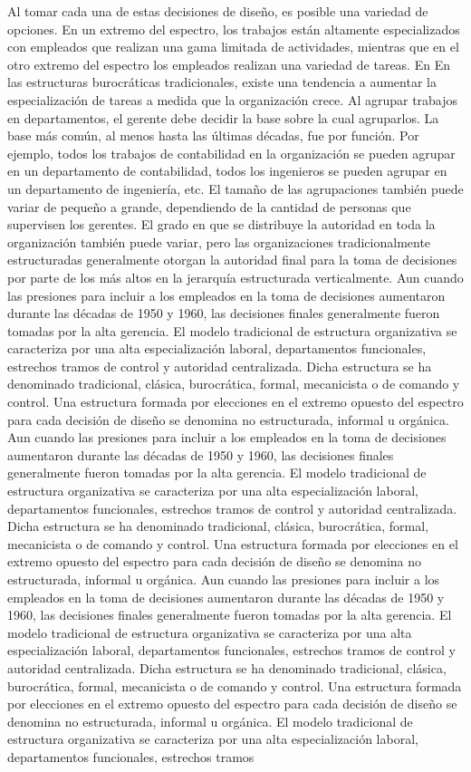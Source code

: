 \documentclass[10pt]{book}
\begin{document}
Al tomar cada una de estas decisiones de diseño, es posible una variedad de opciones. En un extremo del espectro, los trabajos están altamente especializados con empleados que realizan una gama limitada de actividades, mientras que en el otro extremo del espectro los empleados realizan una variedad de tareas. En En las estructuras burocráticas tradicionales, existe una tendencia a aumentar la especialización de tareas a medida que la organización crece. Al agrupar trabajos en departamentos, el gerente debe decidir la base sobre la cual agruparlos. La base más común, al menos hasta las últimas décadas, fue por función. Por ejemplo, todos los trabajos de contabilidad en la organización se pueden agrupar en un departamento de contabilidad, todos los ingenieros se pueden agrupar en un departamento de ingeniería, etc. El tamaño de las agrupaciones también puede variar de pequeño a grande, dependiendo de la cantidad de personas que supervisen los gerentes. El grado en que se distribuye la autoridad en toda la organización también puede variar, pero las organizaciones tradicionalmente estructuradas generalmente otorgan la autoridad final para la toma de decisiones por parte de los más altos en la jerarquía estructurada verticalmente. Aun cuando las presiones para incluir a los empleados en la toma de decisiones aumentaron durante las décadas de 1950 y 1960, las decisiones finales generalmente fueron tomadas por la alta gerencia. El modelo tradicional de estructura organizativa se caracteriza por una alta especialización laboral, departamentos funcionales, estrechos tramos de control y autoridad centralizada. Dicha estructura se ha denominado tradicional, clásica, burocrática, formal, mecanicista o de comando y control. Una estructura formada por elecciones en el extremo opuesto del espectro para cada decisión de diseño se denomina no estructurada, informal u orgánica. Aun cuando las presiones para incluir a los empleados en la toma de decisiones aumentaron durante las décadas de 1950 y 1960, las decisiones finales generalmente fueron tomadas por la alta gerencia. El modelo tradicional de estructura organizativa se caracteriza por una alta especialización laboral, departamentos funcionales, estrechos tramos de control y autoridad centralizada. Dicha estructura se ha denominado tradicional, clásica, burocrática, formal, mecanicista o de comando y control. Una estructura formada por elecciones en el extremo opuesto del espectro para cada decisión de diseño se denomina no estructurada, informal u orgánica. Aun cuando las presiones para incluir a los empleados en la toma de decisiones aumentaron durante las décadas de 1950 y 1960, las decisiones finales generalmente fueron tomadas por la alta gerencia. El modelo tradicional de estructura organizativa se caracteriza por una alta especialización laboral, departamentos funcionales, estrechos tramos de control y autoridad centralizada. Dicha estructura se ha denominado tradicional, clásica, burocrática, formal, mecanicista o de comando y control. Una estructura formada por elecciones en el extremo opuesto del espectro para cada decisión de diseño se denomina no estructurada, informal u orgánica. El modelo tradicional de estructura organizativa se caracteriza por una alta especialización laboral, departamentos funcionales, estrechos tramos 
\end{document}
